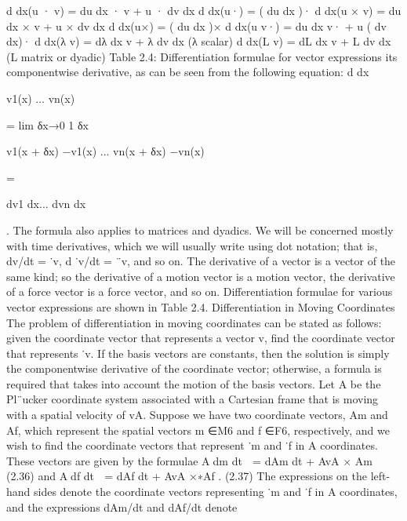 d dx(u · v) = du dx · v + u · dv dx d dx(u·) = ( du dx )· d dx(u × v) = du dx × v + u × dv dx d dx(u×) = ( du dx )× d dx(u v·) = du dx v· + u ( dv dx)· d dx(λ v) = dλ dx v + λ dv dx (λ scalar) d dx(L v) = dL dx v + L dv dx (L matrix or dyadic) Table 2.4: Differentiation formulae for vector expressions its componentwise derivative, as can be seen from the following equation: d dx

v1(x) ... vn(x)

= lim δx→0 1 δx

v1(x + δx) −v1(x) ... vn(x + δx) −vn(x)

=

dv1 dx... dvn dx

. The formula also applies to matrices and dyadics. We will be concerned mostly with time derivatives, which we will usually write using dot notation; that is, dv/dt = ˙v, d ˙v/dt = ¨v, and so on. The derivative of a vector is a vector of the same kind; so the derivative of a motion vector is a motion vector, the derivative of a force vector is a force vector, and so on. Differentiation formulae for various vector expressions are shown in Table 2.4. Differentiation in Moving Coordinates The problem of differentiation in moving coordinates can be stated as follows: given the coordinate vector that represents a vector v, find the coordinate vector that represents ˙v. If the basis vectors are constants, then the solution is simply the componentwise derivative of the coordinate vector; otherwise, a formula is required that takes into account the motion of the basis vectors. Let A be the Pl¨ucker coordinate system associated with a Cartesian frame that is moving with a spatial velocity of vA. Suppose we have two coordinate vectors, Am and Af, which represent the spatial vectors m ∈M6 and f ∈F6, respectively, and we wish to find the coordinate vectors that represent ˙m and ˙f in A coordinates. These vectors are given by the formulae Adm dt  = dAm dt + AvA × Am (2.36) and Adf dt  = dAf dt + AvA ×∗Af . (2.37) The expressions on the left-hand sides denote the coordinate vectors representing ˙m and ˙f in A coordinates, and the expressions dAm/dt and dAf/dt denote

